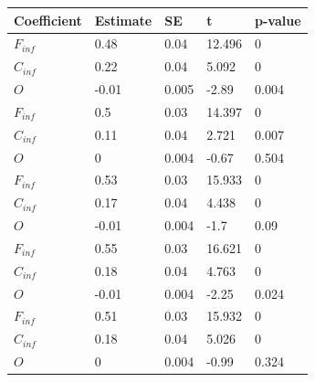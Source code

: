 \begin{tabular}{lllll}
Coefficient & Estimate & SE & t & p-value \\ 
\hline 
$F_{inf}$ & 0.48 & 0.04 & 12.496 & 0 \\ 
$C_{inf}$ & 0.22 & 0.04 & 5.092 & 0 \\ 
$O$ & -0.01 & 0.005 & -2.89 & 0.004 \\ 
$F_{inf}$ & 0.5 & 0.03 & 14.397 & 0 \\ 
$C_{inf}$ & 0.11 & 0.04 & 2.721 & 0.007 \\ 
$O$ & 0 & 0.004 & -0.67 & 0.504 \\ 
$F_{inf}$ & 0.53 & 0.03 & 15.933 & 0 \\ 
$C_{inf}$ & 0.17 & 0.04 & 4.438 & 0 \\ 
$O$ & -0.01 & 0.004 & -1.7 & 0.09 \\ 
$F_{inf}$ & 0.55 & 0.03 & 16.621 & 0 \\ 
$C_{inf}$ & 0.18 & 0.04 & 4.763 & 0 \\ 
$O$ & -0.01 & 0.004 & -2.25 & 0.024 \\ 
$F_{inf}$ & 0.51 & 0.03 & 15.932 & 0 \\ 
$C_{inf}$ & 0.18 & 0.04 & 5.026 & 0 \\ 
$O$ & 0 & 0.004 & -0.99 & 0.324 \\ 
\hline 
\end{tabular}